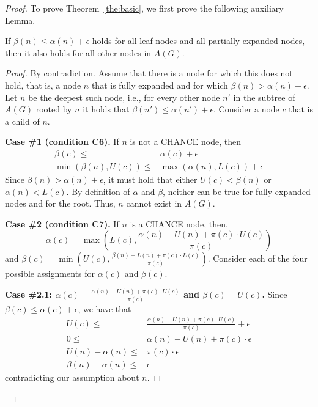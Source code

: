 \documentclass[runningheads]{llncs}
\newcommand{\pess}{\mathit{L}}
\newcommand{\opti}{\mathit{U}}
\begin{document}
\begin{proof}
To prove Theorem~\ref{the:basic}, we first prove the following auxiliary Lemma. 
\begin{lemma}
If $\beta(n)\leq \alpha(n)+\epsilon$ holds for all leaf nodes and all partially expanded nodes, then it also holds for all other nodes in $A(G)$. 
\label{lem:bounded-beta}
\end{lemma}
\begin{proof}
By contradiction. Assume that there is a node for which this does not hold, that is, a node $n$ that is fully expanded and for which $\beta(n)> \alpha(n)+\epsilon$. 
Let $n$ be the deepest such node, i.e., for every other node $n'$ in the subtree of $A(G)$ rooted by $n$ it holds that $\beta(n')\leq \alpha(n')+\epsilon$.  
Consider a node $c$ that is a child of $n$. 

{\bf Case \#1 (condition C6).} 
If $n$ is not a CHANCE node, then 
\begin{align}
\beta(c) \leq & \alpha(c)+\epsilon \\
\min(\beta(n), \opti(c)) \leq & \max(\alpha(n), \pess(c))+\epsilon
\end{align}
Since $\beta(n)>\alpha(n)+\epsilon$, 
it must hold that either $\opti(c)<\beta(n)$
or $\alpha(n)<\pess(c)$. 
By definition of $\alpha$ and $\beta$, neither can be true for fully expanded nodes
and for the root. Thus, $n$ cannot exist in $A(G)$. 


{\bf Case \#2 (condition C7).} 
If $n$ is a CHANCE node, then, 
\[\alpha(c)=\max(\pess(c), \frac{\alpha(n)-\opti(n)+\pi(c)\cdot\opti(c)}{\pi(c)})\]
and $\beta(c)=\min(\opti(c), \frac{\beta(n)-\pess(n)+\pi(c)\cdot\pess(c)}{\pi(c)})$.
Consider each of the four possible assignments for $\alpha(c)$ and $\beta(c)$. 

{\bf Case \#2.1: $\alpha(c)=\frac{\alpha(n)-\opti(n)+\pi(c)\cdot\opti(c)}{\pi(c)}$ 
	and $\beta(c)=\opti(c)$.} 
Since $\beta(c)\leq \alpha(c)+\epsilon$, we have that
\begin{align}
\opti(c) \leq & \frac{\alpha(n)-\opti(n)+\pi(c)\cdot\opti(c)}{\pi(c)}+\epsilon \\
0 \leq & \alpha(n)-\opti(n)+\pi(c)\cdot\epsilon \\
\opti(n)-\alpha(n) \leq & \pi(c)\cdot\epsilon \\
\beta(n)-\alpha(n) \leq & \epsilon 
\end{align}
contradicting our assumption about $n$. 


\end{proof}
\end{proof}
\end{document}
